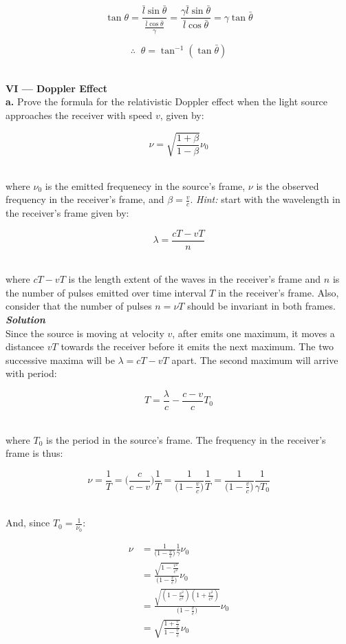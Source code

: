 \documentclass[9pt]{extarticle}
\newcommand{\bfit}[1]{\textbf{\textit{#1}}}
\begin{document}
\begin{multicols*}{2}
$$\tan\theta = \frac{\bar l \sin\bar\theta}{\frac{\bar l\cos\bar\theta}{\gamma}} = \frac{\gamma \bar l \sin\bar\theta}{\bar l\cos\bar\theta} = \gamma \tan\bar\theta$$ 

$$\therefore \;\; \theta = \tan^{-1}(\tan\bar\theta)$$ \ 




 

\hrulefill 

\hfill 

{\LARGE \bf VI --- Doppler Effect} \\ 

{\Large \bf a.} Prove the formula for the relativistic Doppler effect when the light source approaches the receiver with speed $v$, given by:

$$\nu = \sqrt{\frac{1+\beta}{1-\beta}} \nu_0$$ \ 

where $\nu_0$ is the emitted frequenecy in the source's frame, $\nu$ is the observed frequency in the receiver's frame, and $\beta = \frac vc$. {\it Hint:} start with the wavelength in the receiver's frame given by:

$$\lambda = \frac{cT - vT}{n}$$ \ 

where $cT - vT$ is the length extent of the waves in the receiver's frame and $n$ is the number of pulses emitted over time interval $T$ in the receiver's frame. Also, consider that the number of pulses $n = \nu T$ should be invariant in both frames. \\ 

{\bfit{Solution}} \\ 

Since the source is moving at velocity $v$, after emits one maximum, it moves a distancee $vT$ towards the receiver before it emits the next maximum. The two successive maxima will be $\lambda = cT-vT$ apart. The second maximum will arrive with period:

$$T = \frac \lambda c - \frac{c-v}{c} T_0$$ \ 

where $T_0$ is the period in the source's frame. The frequency in the receiver's frame is thus:

$$\nu = \frac{1}{T} = \bigg(\frac{c}{c-v} \bigg) \frac 1T = \frac{1}{\big( 1-\frac vc \big)} \frac{1}{T} = \frac{1}{\big( 1-\frac vc \big)} \frac{1}{\gamma T_0}$$ \

And, since $T_0 = \frac{1}{\nu_0}$:

$$
\begin{aligned}
	\nu &= \frac{1}{\big( 1-\frac vc \big)} \frac 1\gamma \nu_0 \\ 
	&= \frac{\sqrt{1-\frac{v^2}{c^2}}}{\big( 1-\frac vc \big)} \nu_0 \\ 
	&= \frac{\sqrt{(1-\frac{v^2}{c^2})(1+\frac{v^2}{c^2})}}{\big( 1-\frac vc \big)} \nu_0 \\
	&= \sqrt{\frac{1+\frac vc}{1-\frac vc}} \nu_0 
\end{aligned}
$$ \ 


\end{multicols*}
\end{document}
